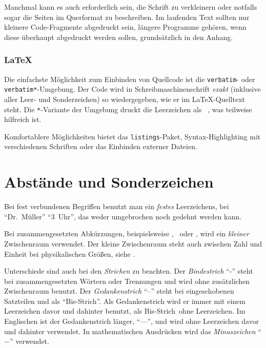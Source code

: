 Manchmal kann es auch erforderlich sein, die Schrift zu verkleinern oder notfalls sogar die Seiten im Querformat zu beschreiben.
Im laufenden Text sollten nur kleinere Code-Fragmente abgedruckt sein, längere Programme gehören, wenn diese überhaupt abgedruckt werden sollen, grundsätzlich in den Anhang.



\subsubsection*{\LaTeX}

Die einfachste Möglichkeit zum Einbinden von Quellcode ist die \verb|verbatim|- oder \verb|verbatim*|-Umgebung.
Der Code wird in Schreibmaschinenschrift \emph{exakt} (inklusive aller Leer- und Sonderzeichen) so wiedergegeben, wie er im \LaTeX-Quelltext steht.
Die \verb|*|-Variante der Umgebung druckt die Leerzeichen als \verb*| |, was teilweise hilfreich ist.

Komfortablere Möglichkeiten bietet das \verb|listings|-Paket, \zB Syntax-Highlighting mit verschiedenen Schriften oder das Einbinden externer Dateien.


\section{Abstände und Sonderzeichen}
\label{sec:Sonderzeichen}

Bei fest verbundenen Begriffen benutzt man ein \emph{festes} Leerzeichens, \zB bei "`Dr.~Müller"' "`3~Uhr"', das weder umgebrochen noch gedehnt werden kann.

Bei zusammengesetzten Abkürzungen, beispielsweise \glqq\dah{}\grqq, \glqq\ua{}\grqq\ oder \glqq\zB{}\grqq, wird ein \emph{kleiner} Zwischenraum verwendet.
Der kleine Zwischenraum steht auch zwischen Zahl und Einheit bei physikalischen Größen, siehe .

Unterschiede sind auch bei den \emph{Strichen} zu beachten.
Der \emph{Bindestrich} "`-"' steht bei zusammengesetzten Wörtern oder Trennungen und wird ohne zusätzlichen Zwischenraum benutzt.
Der \emph{Gedankenstrich} "`--"' steht bei eingeschobenen Satzteilen und als "`Bis-Strich"'.
Als Gedankenstrich wird er immer mit einem Leerzeichen davor und dahinter benutzt, als \glqq Bis-Strich\grqq\ ohne Leerzeichen. Im Englischen ist der Gedankenstrich länger, "`---"', und wird ohne Leerzeichen davor und dahinter verwendet.
In mathematischen Ausdrücken wird das \emph{Minuszeichen} "`$-$"' verwendet.

